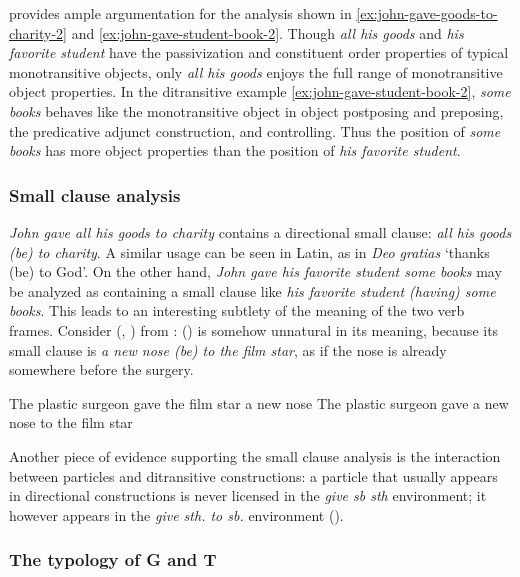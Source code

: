 \documentclass[UTF8, a4paper, oneside, scheme=plain, 12pt]{ctexbook}
\newcommand*{\citesec}[1]{\S~{#1}}
\newcommand*{\citechap}[1]{Ch.~{#1}}
\newcommand*{\citepage}[1]{p.~{#1}}
\newcommand{\form}[1]{\emph{#1}}
\newcommand{\translate}[1]{`#1'}
\begin{document}
\citet[\citechap{4}, \citesec{4.3}]{cgel} provides ample argumentation for the analysis shown in 
\eqref{ex:john-gave-goods-to-charity-2} and \eqref{ex:john-gave-student-book-2}.
Though \form{all his goods} and \form{his favorite student} 
have the passivization and constituent order properties of typical monotransitive objects,
only \form{all his goods} enjoys the full range of monotransitive object properties.
In the ditransitive example \eqref{ex:john-gave-student-book-2},
\form{some books} behaves like the monotransitive object 
in object postposing and preposing, the predicative adjunct construction, and controlling.
Thus the position of \form{some books} has more object properties 
than the position of \form{his favorite student}.

\subsubsection{Small clause analysis}

\form{John gave all his goods to charity} contains a directional small clause:
\form{all his goods (be) to charity}.
A similar usage can be seen in Latin, as in \form{Deo gratias} \translate{thanks (be) to God}.
On the other hand, \form{John gave his favorite student some books}
may be analyzed as containing a small clause like \form{his favorite student (having) some books}.
This leads to an interesting subtlety of the meaning of the two verb frames.
Consider (, )
from \citet[\citepage{81}]{devine2006latin}:
() is somehow unnatural in its meaning, 
because its small clause is \form{a new nose (be) to the film star}, 
as if the nose is already somewhere before the surgery.

\begin{exe}
    \ex\label{ex:valence.give.1} The plastic surgeon gave the film star a new nose 
    \ex\label{ex:valence.give.2} The plastic surgeon gave a new nose to the film star
\end{exe}

Another piece of evidence supporting the small clause analysis 
is the interaction between particles and ditransitive constructions: 
a particle that usually appears in directional constructions 
is never licensed in the \form{give sb sth} environment; 
it however appears in the \form{give sth. to sb.} environment
().

\subsubsection{The typology of G and T}\label{sec:g-t-typology}
\end{document}
